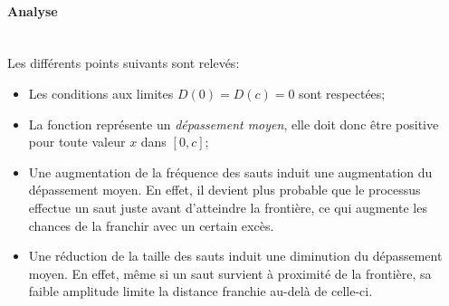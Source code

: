 \FloatBarrier\paragraph{Analyse}\phantom{}\\
Les différents points suivants sont relevés:
\begin{itemize}
    \item Les conditions aux limites $D(0)=D(c)=0$ sont respectées;
    \item La fonction représente un \textit{dépassement moyen}, elle doit donc être positive pour toute valeur $x$ dans $[0,c]$;
    \item Une augmentation de la fréquence des sauts induit une augmentation du dépassement moyen. En effet, il devient plus probable que le processus effectue un saut juste avant d'atteindre la frontière, ce qui augmente les chances de la franchir avec un certain excès.
    \item Une réduction de la taille des sauts induit une diminution du dépassement moyen. En effet, même si un saut survient à proximité de la frontière, sa faible amplitude limite la distance franchie au-delà de celle-ci.
\end{itemize}

